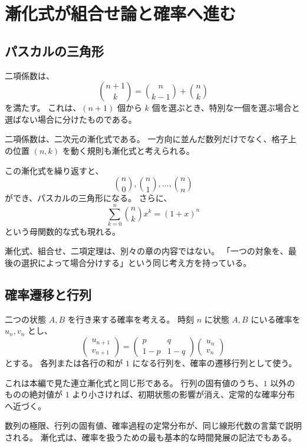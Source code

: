 
\section{漸化式が組合せ論と確率へ進む}

\subsection{パスカルの三角形}

二項係数は、
\[
  \binom{n+1}{k}
  =
  \binom{n}{k-1}+\binom{n}{k}
\]
を満たす。
これは、$(n+1)$ 個から $k$ 個を選ぶとき、特別な一個を選ぶ場合と選ばない場合に分けたものである。

二項係数は、二次元の漸化式である。
一方向に並んだ数列だけでなく、格子上の位置 $(n,k)$ を動く規則も漸化式と考えられる。

この漸化式を繰り返すと、
\[
  \binom{n}{0},\binom{n}{1},\ldots,\binom{n}{n}
\]
ができ、パスカルの三角形になる。
さらに、
\[
  \sum_{k=0}^{n}\binom{n}{k}x^k=(1+x)^n
\]
という母関数的な式も現れる。

漸化式、組合せ、二項定理は、別々の章の内容ではない。
「一つの対象を、最後の選択によって場合分けする」という同じ考え方を持っている。

\subsection{確率遷移と行列}

二つの状態 $A,B$ を行き来する確率を考える。
時刻 $n$ に状態 $A,B$ にいる確率を $u_n,v_n$ とし、
\[
  \begin{pmatrix}u_{n+1}\\v_{n+1}\end{pmatrix}
  =
  \begin{pmatrix}p&q\\1-p&1-q\end{pmatrix}
  \begin{pmatrix}u_n\\v_n\end{pmatrix}
\]
とする。
各列または各行の和が $1$ になる行列を、確率の遷移行列として使う。

これは本編で見た連立漸化式と同じ形である。
行列の固有値のうち、$1$ 以外のものの絶対値が $1$ より小さければ、初期状態の影響が消え、定常的な確率分布へ近づく。

数列の極限、行列の固有値、確率過程の定常分布が、同じ線形代数の言葉で説明される。
漸化式は、確率を扱うための最も基本的な時間発展の記法でもある。

